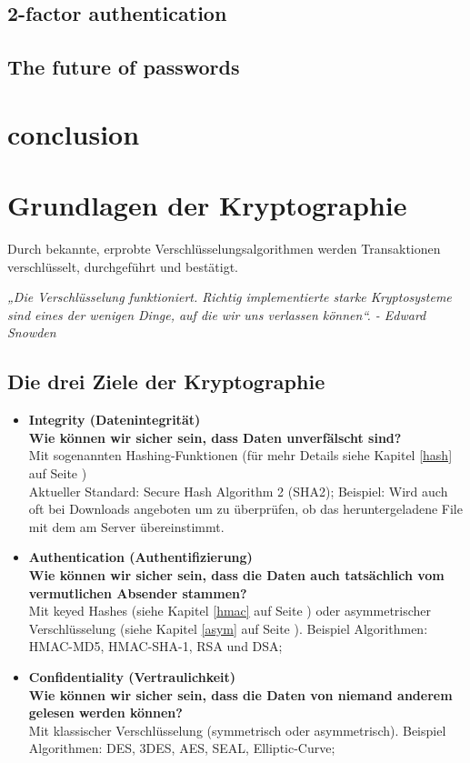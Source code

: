 \documentclass[10pt,a4paper,titlepage]{paper}
\begin{document}
\subsection{2-factor authentication}
\subsection{The future of passwords}

\section{conclusion}

\section{Grundlagen der Kryptographie}
Durch bekannte, erprobte Verschlüsselungsalgorithmen werden Transaktionen
verschlüsselt, durchgeführt und bestätigt.
\begin{center}
\textit{„Die Verschlüsselung funktioniert. Richtig implementierte starke
Kryptosysteme sind eines der wenigen Dinge, auf die wir uns verlassen können“. - Edward Snowden}
\end{center}
\subsection{Die drei Ziele der Kryptographie}
\begin{itemize}
\item \textbf{Integrity (Datenintegrität)\\ Wie können wir sicher sein, dass Daten unverfälscht sind?}\\ Mit sogenannten Hashing-Funktionen (für mehr Details siehe Kapitel \ref{hash} auf Seite \pageref{hash})\\ Aktueller Standard: Secure Hash Algorithm 2 (SHA2); Beispiel: Wird auch oft bei Downloads angeboten um zu überprüfen, ob das heruntergeladene File mit dem am Server übereinstimmt. 
\item \textbf{Authentication (Authentifizierung)\\ Wie können wir sicher sein, dass die Daten auch tatsächlich vom vermutlichen Absender stammen?}\\Mit keyed Hashes (siehe Kapitel \ref{hmac} auf Seite \pageref{hmac}) oder asymmetrischer Verschlüsselung (siehe Kapitel \ref{asym} auf Seite \pageref{asym}). Beispiel Algorithmen: HMAC-MD5, HMAC-SHA-1, RSA und DSA;
\item \textbf{Confidentiality (Vertraulichkeit)\\ Wie können wir sicher sein, dass die Daten von niemand anderem gelesen werden können?}\\Mit klassischer Verschlüsselung (symmetrisch oder asymmetrisch). Beispiel Algorithmen: DES, 3DES, AES, SEAL, Elliptic-Curve;
\end{itemize}
\end{document}
